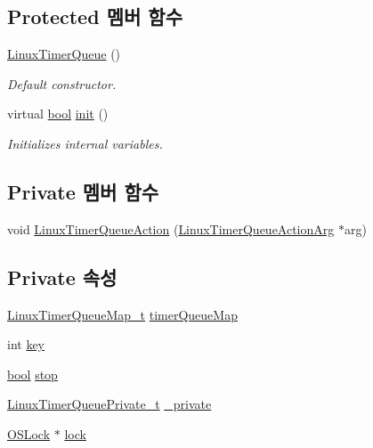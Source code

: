 \subsection*{Protected 멤버 함수}
\begin{DoxyCompactItemize}
\item 
\hyperlink{class_linux_timer_queue_a3a1624718eac03aabe338148163a8c97}{Linux\+Timer\+Queue} ()
\begin{DoxyCompactList}\small\item\em Default constructor. \end{DoxyCompactList}\item 
virtual \hyperlink{avb__gptp_8h_af6a258d8f3ee5206d682d799316314b1}{bool} \hyperlink{class_linux_timer_queue_aee8048628ff2b5c026c9e15acdcaacb8}{init} ()
\begin{DoxyCompactList}\small\item\em Initializes internal variables. \end{DoxyCompactList}\end{DoxyCompactItemize}
\subsection*{Private 멤버 함수}
\begin{DoxyCompactItemize}
\item 
void \hyperlink{class_linux_timer_queue_a423ad61c56c43b1562df656060ba6a73}{Linux\+Timer\+Queue\+Action} (\hyperlink{struct_linux_timer_queue_action_arg}{Linux\+Timer\+Queue\+Action\+Arg} $\ast$arg)
\end{DoxyCompactItemize}
\subsection*{Private 속성}
\begin{DoxyCompactItemize}
\item 
\hyperlink{linux__hal__common_8hpp_ac74f8b051ab5568ff5d8938e7e594ced}{Linux\+Timer\+Queue\+Map\+\_\+t} \hyperlink{class_linux_timer_queue_a108ec18a8374f47037489ab2d93b73ba}{timer\+Queue\+Map}
\item 
int \hyperlink{class_linux_timer_queue_a35af0be900467fedbb610bd6ea65ed78}{key}
\item 
\hyperlink{avb__gptp_8h_af6a258d8f3ee5206d682d799316314b1}{bool} \hyperlink{class_linux_timer_queue_a53a2d16dac430353052f49aaa0cce34a}{stop}
\item 
\hyperlink{linux__hal__common_8hpp_aa2cde2c34cbf889762eaa42f613d9270}{Linux\+Timer\+Queue\+Private\+\_\+t} \hyperlink{class_linux_timer_queue_a7bb3221b5cf50ce69a938da040601c1b}{\+\_\+private}
\item 
\hyperlink{class_o_s_lock}{O\+S\+Lock} $\ast$ \hyperlink{class_linux_timer_queue_abdb6f223dacf8c3cf12e918dd48ed210}{lock}
\end{DoxyCompactItemize}
